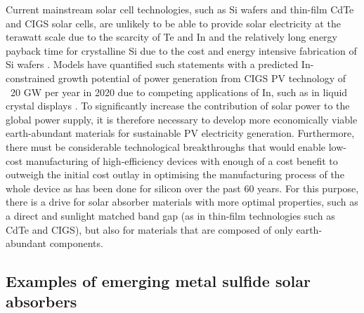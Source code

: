 \documentclass[11pt, twoside]{report}
\begin{document}

Current mainstream solar cell technologies, such as Si wafers and thin-film CdTe and CIGS solar cells, are unlikely to be able to provide solar electricity at the terawatt scale due to the scarcity of Te and In and the relatively long energy payback time for crystalline Si due to the cost and energy intensive fabrication of Si wafers \cite{CZTS_vs_MAPI}. 
Models have quantified such statements with a predicted In-constrained growth potential of power generation from CIGS PV technology of ~20 GW per year in 2020 due to competing applications of In, such as in liquid crystal displays \cite{culprit_5_3}.
To significantly increase the contribution of solar power to the global power supply, it is therefore necessary to develop more economically viable earth-abundant materials for sustainable PV electricity generation. Furthermore, there must be considerable technological breakthroughs that would enable low-cost manufacturing of high-efficiency devices with enough of a cost benefit to outweigh the initial cost outlay in optimising the manufacturing process of the whole device as has been done for silicon over the past 60 years. For this purpose, there is a drive for solar absorber materials with more optimal properties, such as a direct and sunlight matched band gap (as in thin-film technologies such as CdTe and CIGS), but also for materials that are composed of only earth-abundant components.\\


\subsection{Examples of emerging metal sulfide solar absorbers}
\end{document}
